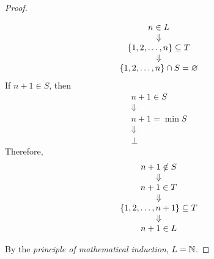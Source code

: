\begin{proof}
\begin{itemize}
\[\begin{array}{c}
            n \in L \\
            \Downarrow \\
            \set*{1, 2, \dots, n} \subseteq T \\
            \Downarrow \\
            \set*{1, 2, \dots, n} \cap S = \vnot
        \end{array}
        \]
        If $n + 1 \in S$, then
        \[
        \begin{array}{c}
            n + 1 \in S \\
            \Downarrow \\
            n + 1 = \min S \\
            \Downarrow \\
            \bot
        \end{array}
        \]
        Therefore,
        \[
        \begin{array}{c}
            n + 1 \notin S \\
            \Downarrow \\
            n + 1 \in T \\
            \Downarrow \\
            \set*{1, 2, \dots, n + 1} \subseteq T \\
            \Downarrow \\
            n + 1 \in L
        \end{array}
        \]
    \end{itemize}
    By the \emph{principle of mathematical induction}, $L = \N$.
\end{proof}


